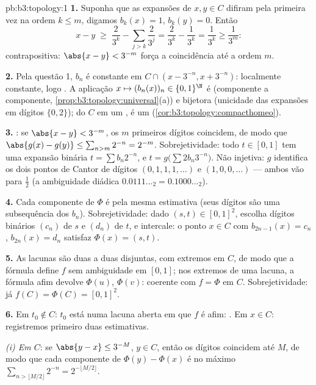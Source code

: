 \begin{solution}{pb:b3:topology:1}
\textbf{1.} Suponha que as expansões de $x, y \in C$ difiram pela primeira vez
na ordem $k \leq m$, digamos $b_k(x) = 1$, $b_k(y) = 0$. Então
\[
x - y \;\geq\; \frac{2}{3^k} - \sum_{j > k}\frac{2}{3^j}
= \frac{2}{3^k} - \frac{1}{3^k} = \frac1{3^k} \geq \frac1{3^m}:
\]
contrapositiva: $\abs{x - y} < 3^{-m}$ força a coincidência até a
ordem $m$.

\textbf{2.} Pela questão 1, $b_n$ é constante em $C \cap (x -
3^{-n}, x + 3^{-n})$: localmente constante, logo . A
aplicação $x \mapsto (b_n(x))_n \in \{0,1\}^\N$ é 
(componente a componente, \cref{prop:b3:topology:universal}(a)) e
bijetora (unicidade das expansões em dígitos $\{0,2\}$); do 
$C$ em um , é um 
(\cref{cor:b3:topology:compacthomeo}).

\textbf{3.} : se $\abs{x - y} < 3^{-m}$, os
$m$ primeiros dígitos coincidem, de modo que $\abs{g(x) - g(y)} \leq \sum_{n > m}2^{-n}
= 2^{-m}$. Sobrejetividade: todo $t \in [0,1]$ tem uma expansão
binária $t = \sum b_n2^{-n}$, e $t = g\bigl(\sum
2b_n3^{-n}\bigr)$. Não injetiva: $g$ identifica os dois pontos de Cantor
de dígitos $(0,1,1,1,\dots)$ e $(1,0,0,\dots)$ ---
ambos vão para $\frac12$ (a ambiguidade diádica $0.0111\ldots_2 =
0.1000\ldots_2$).

\textbf{4.} Cada componente de $\Phi$ é  pela mesma
estimativa (seus dígitos são uma subsequência dos $b_n$).
Sobrejetividade: dado $(s, t) \in [0,1]^2$, escolha dígitos binários
$(c_n)$ de $s$ e $(d_n)$ de $t$, e intercale: o ponto $x
\in C$ com $b_{2n-1}(x) = c_n$, $b_{2n}(x) = d_n$ satisfaz
$\Phi(x) = (s,t)$.

\textbf{5.} As lacunas são duas a duas disjuntas, com extremos em
$C$, de modo que a fórmula define $f$ sem ambiguidade em $[0,1]$; nos
extremos de uma lacuna, a fórmula afim devolve $\Phi(u)$,
$\Phi(v)$: coerente com $f = \Phi$ em $C$. Sobrejetividade:
já $f(C) = \Phi(C) = [0,1]^2$.

\textbf{6.} Em $t_0 \notin C$: $t_0$ está numa lacuna aberta em
que $f$ é afim: . Em $x \in C$: registremos primeiro
duas estimativas.

\emph{(i) Em $C$}: se $\abs{y - x} \leq 3^{-M}$, $y \in C$,
então os dígitos coincidem até $M$, de modo que cada componente de $\Phi(y)
- \Phi(x)$ é no máximo $\sum_{n > \lfloor M/2\rfloor} 2^{-n} =
2^{-\lfloor M/2\rfloor}$.


\end{solution}

